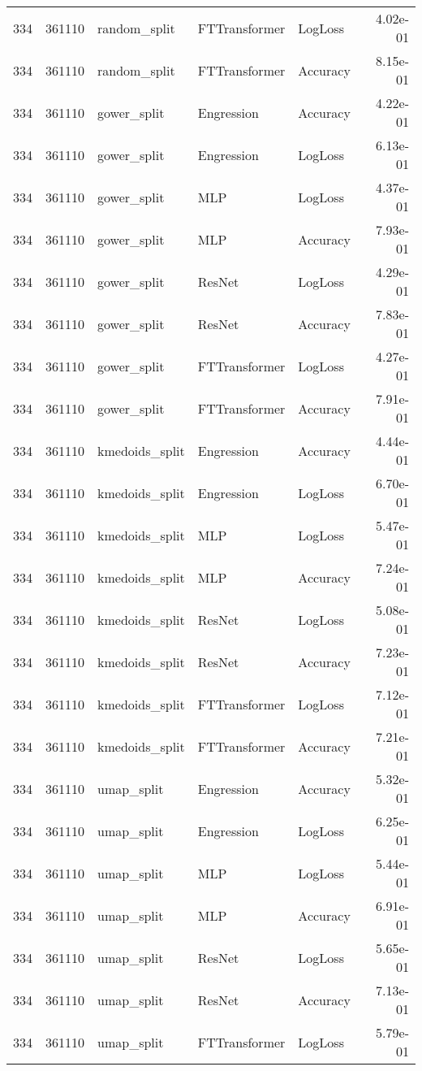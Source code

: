 \begin{tabular}{rrlllr}
334 & 361110 & random\_split & FTTransformer & LogLoss & 4.02e-01 \\
334 & 361110 & random\_split & FTTransformer & Accuracy & 8.15e-01 \\
334 & 361110 & gower\_split & Engression & Accuracy & 4.22e-01 \\
334 & 361110 & gower\_split & Engression & LogLoss & 6.13e-01 \\
334 & 361110 & gower\_split & MLP & LogLoss & 4.37e-01 \\
334 & 361110 & gower\_split & MLP & Accuracy & 7.93e-01 \\
334 & 361110 & gower\_split & ResNet & LogLoss & 4.29e-01 \\
334 & 361110 & gower\_split & ResNet & Accuracy & 7.83e-01 \\
334 & 361110 & gower\_split & FTTransformer & LogLoss & 4.27e-01 \\
334 & 361110 & gower\_split & FTTransformer & Accuracy & 7.91e-01 \\
334 & 361110 & kmedoids\_split & Engression & Accuracy & 4.44e-01 \\
334 & 361110 & kmedoids\_split & Engression & LogLoss & 6.70e-01 \\
334 & 361110 & kmedoids\_split & MLP & LogLoss & 5.47e-01 \\
334 & 361110 & kmedoids\_split & MLP & Accuracy & 7.24e-01 \\
334 & 361110 & kmedoids\_split & ResNet & LogLoss & 5.08e-01 \\
334 & 361110 & kmedoids\_split & ResNet & Accuracy & 7.23e-01 \\
334 & 361110 & kmedoids\_split & FTTransformer & LogLoss & 7.12e-01 \\
334 & 361110 & kmedoids\_split & FTTransformer & Accuracy & 7.21e-01 \\
334 & 361110 & umap\_split & Engression & Accuracy & 5.32e-01 \\
334 & 361110 & umap\_split & Engression & LogLoss & 6.25e-01 \\
334 & 361110 & umap\_split & MLP & LogLoss & 5.44e-01 \\
334 & 361110 & umap\_split & MLP & Accuracy & 6.91e-01 \\
334 & 361110 & umap\_split & ResNet & LogLoss & 5.65e-01 \\
334 & 361110 & umap\_split & ResNet & Accuracy & 7.13e-01 \\
334 & 361110 & umap\_split & FTTransformer & LogLoss & 5.79e-01 \\

\end{tabular}

